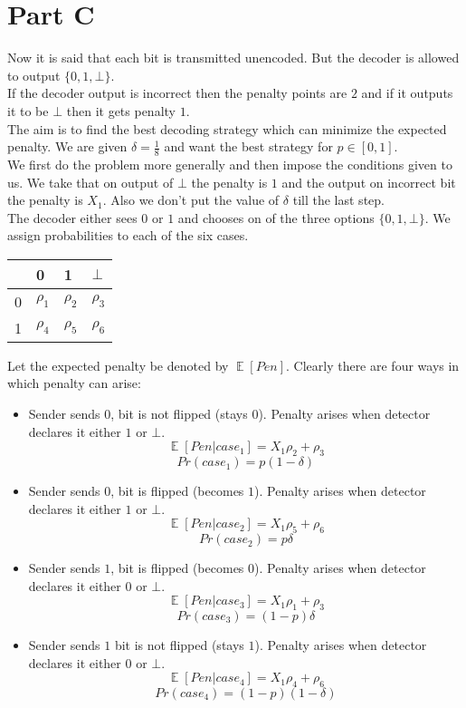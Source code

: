 \documentclass{article}
\DeclareMathOperator{\E}{\mathbb{E}}
\begin{document}
\section{Part C}
Now it is said that each bit is transmitted unencoded. But the decoder is allowed to output $\{0,1,\bot\}$. \\
If the decoder output is incorrect then the penalty points are $2$ and if it outputs it to be $\bot$ then it gets penalty $1$.\\
The aim is to find the best decoding strategy which can minimize the expected penalty. We are given $\delta=\frac{1}{8}$ and want the best strategy for $p \in [0,1]$.\\

We first do the problem more generally and then impose the conditions given to us. We take that on output of $\bot$ the penalty is $1$ and the output on incorrect bit the penalty is $X_1$. Also we don't put the value of $\delta$ till the last step.\\

The decoder either sees $0$ or $1$ and chooses on of the three options $\{0,1,\bot\}$. We assign probabilities to each of the six cases.
\begin{center}
  \begin{tabular}[H]{|l|l|l|l|}
    \hline
    & 0 & 1 & $\bot$\\
    \hline
    0 & $\rho_1$ & $\rho_2$ & $\rho_3$\\
    \hline
    1 & $\rho_4$ & $\rho_5$ & $\rho_6$\\
    \hline
  \end{tabular}
\end{center}

Let the expected penalty be denoted by $\E[Pen]$. Clearly there are four ways in which penalty can arise:
\begin{itemize}
\item Sender sends $0$, bit is not flipped (stays $0$). Penalty arises when detector declares it either $1$ or $\bot$. $$\E[Pen|case_1] = X_1\rho_2 + \rho_3$$
  $$Pr(case_1) = p(1-\delta)$$
\item Sender sends $0$, bit is flipped (becomes $1$). Penalty arises when detector declares it either $1$ or $\bot$. $$\E[Pen|case_2] = X_1\rho_5  + \rho_6$$
  $$Pr(case_2) = p\delta$$
\item Sender sends $1$, bit is flipped (becomes $0$). Penalty arises when detector declares it either $0$ or $\bot$. $$\E[Pen|case_3] = X_1 \rho_1 + \rho_3$$
  $$Pr(case_3) = (1-p)\delta$$
\item Sender sends $1$ bit is not flipped (stays $1$). Penalty arises when detector declares it either $0$ or $\bot$. $$\E[Pen|case_4] = X_1 \rho_4 + \rho_6$$
  $$Pr(case_4) = (1-p)(1-\delta)$$
\end{itemize}
\end{document}
